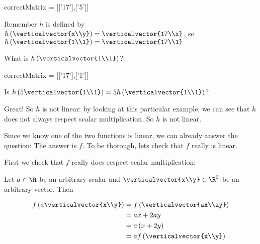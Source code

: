 \documentclass{ximera}
\begin{document}
\begin{question}
\begin{solution}
\begin{hint}
\begin{question}
\begin{solution}
        	\begin{matrix-answer}[name=v]
    			  correctMatrix = [['17'],['5']]
        	 \end{matrix-answer}
        	\end{solution}
        	\begin{solution}
		\begin{hint}
			Remember $h$ is defined by $h\left( \verticalvector{x\\y}\right) =\verticalvector{17\\x}$, so
			$h\left(\verticalvector{1\\1}\right) =  \verticalvector{17\\1}$
		\end{hint}
        	 What is $h\left(\verticalvector{1\\1}\right)$?
        	 \begin{matrix-answer}[name=v]
    			  correctMatrix = [['17'],['1']]
        	 \end{matrix-answer}
        	\end{solution}
        	\begin{solution}
        		Is $h\left(5 \verticalvector{1\\1}\right) = 5 h\left(\verticalvector{1\\1}\right)$?
        		\begin{multiple-choice}
        		\choice{Yes}
        		\choice[correct]{No}
        		\end{multiple-choice}
        	\end{solution}
        	Great!  So $h$ is not linear:  by looking at this particular example, we can see that $h$ does not always respect scalar multiplication.  So $h$ is not linear.
		
        	Since we know one of the two functions is linear, we can already answer the question:  The answer is $f$.  To be thorough, lets check that $f$ really is linear.
		
        	First we check that $f$ really does respect scalar multiplication:
		
        	Let $a \in \R$ be an arbitrary scalar and $\verticalvector{x\\y} \in \R^2$ be an arbitrary vector.  Then
		
        	\begin{align*}
        	 f\left(a\verticalvector{x\\y}\right) &= f\left(\verticalvector{ax\\ay}\right)\\
        	 &= ax+2ay\\
        	 &= a\left(x+2y\right)\\
        	 &=af\left(\verticalvector{x\\y}\right) 		
        	 \end{align*}
		 

\end{question}
\end{hint}
\end{solution}
\end{question}
\end{document}
